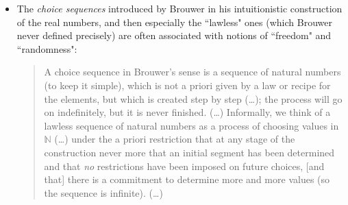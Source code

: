 \documentclass[11pt,a4paper]{article}
\numberwithin{equation}{section}
\newcommand{\N}{{\mathbb N}} \newcommand{\R}{{\mathbb R}}
\begin{document}
\begin{itemize}
{Even if one goes along with that, discussions tend to become circular.
}
\begin{enumerate}
\item \emph{Against first appearances there \emph{was} a causal connection, either through a common cause or through direct causation.} This often works in daily life, and also in Bohmian mechanics, where direct (superluminal) causation is taken to be the ``explanation" of the correlations  in the experiments just referred to. However, if superluminal causation is banned, then one's hand is empty because  one interpretation of Bell's Theorem (cf.\ Appendix \ref{FWT}) excludes common causes (van Fraassen, 1991), and hence both kinds of causation are out!  See also  \S\ref{RQM}. 
\item \emph{The concurrence of events was not at all as surprising as initially thought.} This argument is either based on the inability of most people to estimate probabilities correctly (as in the well-known  birthday problem), or, if the events were really unlikely, on
  what Diaconis and Mosteller call \emph{the law of truly large numbers}:\footnote{In a slightly different phrasing this ``law"  is also called  \emph{The Improbability Principle} (Hand, 2015).}
  \begin{quote}\begin{small}
With a large enough sample, any outrageous thing is likely to happen.  (Diaconis \& Mosteller, 1989, p.\ 859).
   \end{small}\end{quote}
\end{enumerate}
  Neither of this helps in  ERR--Bohm--Bell, though, leaving one's hand \emph{truly} empty.
\item The \emph{choice sequences} introduced by Brouwer in his intuitionistic construction of the real numbers, and then especially the ``lawless" ones (which Brouwer never defined precisely) are often associated with notions of ``freedom" and ``randomness":
\begin{quote}\begin{small}
A choice sequence in Brouwer's sense is a sequence of natural numbers (to keep it simple), which is not a priori given by a law or recipe for the elements, but which is created step by step (\ldots); the process will go on indefinitely, but it is never finished.  (\ldots) Informally, we think of a lawless sequence of natural numbers as a process of choosing values in $\N$ (\ldots) under the a priori restriction that at any stage of the construction never more that an initial segment has been determined and that \emph{no} restrictions have been imposed on future choices, [and that] there is a commitment to determine more and more values (so the sequence is infinite). (\ldots)

\end{small}
\end{quote}
\end{itemize}
\end{document}
